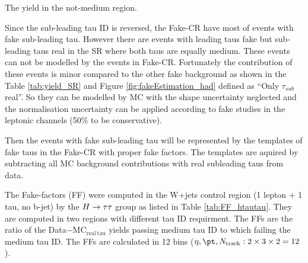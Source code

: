 \begin{table}
\caption{The yield in the not-medium region.}
\label{tab:hadronic_nm_yield}

\end{table}

Since the sub-leading tau ID is reversed, the Fake-CR have most of events with fake sub-leading tau. However there are events with leading taus fake but sub-leading taus real in the SR where both taus are equally medium. These events can not be modelled by the events in Fake-CR. Fortunately the contribution of these events is minor compared to the other fake background as shown in the Table \ref{tab:yield_SR} and Figure \ref{fig:fakeEstimation_had} defined as ``Only $\tau_{sub}$ real''. So they can be modelled by MC with the shape uncertainty neglected and the normalisation uncertainty can be applied according to fake studies in the leptonic channels (50\% to be conservative).

Then the events with fake sub-leading tau will be represented by the templates of fake taus in the Fake-CR with proper fake factors. The templates are aquired by subtracting all MC background contributions with real subleading taus from data.

The Fake-factors (FF) were computed in the W+jets control region (1 lepton + 1 tau, no b-jet) by the $H \rightarrow \tau\tau$ group \cite{Htautau-note} as listed in Table \ref{tab:FF_htautau}. They are computed in two regions with different tau ID requirment. The FFs are the ratio of the Data$-$MC$_\mathrm{real~tau}$ yields passing medium tau ID to which failing the medium tau ID. The FFs are calculated in 12 bins ($\eta,\pt,N_\mathrm{track}:2\times3\times2=12$).

